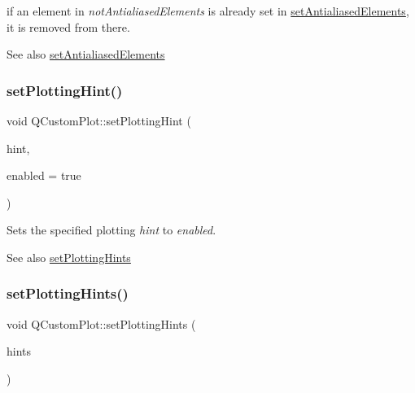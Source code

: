 if an element in {\itshape not\+Antialiased\+Elements} is already set in \hyperlink{class_q_custom_plot_af6f91e5eab1be85f67c556e98c3745e8}{set\+Antialiased\+Elements}, it is removed from there.

\begin{DoxySeeAlso}{See also}
\hyperlink{class_q_custom_plot_af6f91e5eab1be85f67c556e98c3745e8}{set\+Antialiased\+Elements} 
\end{DoxySeeAlso}
\hypertarget{class_q_custom_plot_a3b7c97bb6c16464e9e15190c07abe9a9}{}\label{class_q_custom_plot_a3b7c97bb6c16464e9e15190c07abe9a9} 
\subsubsection{\texorpdfstring{set\+Plotting\+Hint()}{setPlottingHint()}}
{\footnotesize\ttfamily void Q\+Custom\+Plot\+::set\+Plotting\+Hint (\begin{DoxyParamCaption}\item[{\hyperlink{namespace_q_c_p_a5400e5fcb9528d92002ddb938c1f4ef4}{Q\+C\+P\+::\+Plotting\+Hint}}]{hint,  }\item[{bool}]{enabled = {\ttfamily true} }\end{DoxyParamCaption})}

Sets the specified plotting {\itshape hint} to {\itshape enabled}.

\begin{DoxySeeAlso}{See also}
\hyperlink{class_q_custom_plot_a94a33cbdadbbac5934843508bcfc210d}{set\+Plotting\+Hints} 
\end{DoxySeeAlso}
\hypertarget{class_q_custom_plot_a94a33cbdadbbac5934843508bcfc210d}{}\label{class_q_custom_plot_a94a33cbdadbbac5934843508bcfc210d} 
\subsubsection{\texorpdfstring{set\+Plotting\+Hints()}{setPlottingHints()}}
{\footnotesize\ttfamily void Q\+Custom\+Plot\+::set\+Plotting\+Hints (\begin{DoxyParamCaption}\item[{const Q\+C\+P\+::\+Plotting\+Hints \&}]{hints }\end{DoxyParamCaption})}

